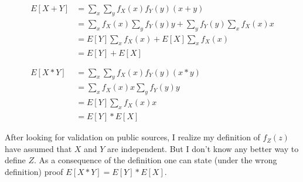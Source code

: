 \documentclass[a4paper,11pt]{article}
\begin{document}
\begin{align*}
 E[X+Y] &= \sum_x \sum_y f_X(x)f_Y(y)(x+y) \\
        &= \sum_x f_X(x) \sum_y f_Y(y)y + \sum_y f_Y(y) \sum_x f_X(x)x \\
        &= E[Y]\sum_x f_X(x) + E[X]\sum_x f_X(x) \\
        &= E[Y] + E[X]\\
\\
\\
 E[X*Y] &= \sum_x \sum_y f_X(x)f_Y(y)(x*y) \\
        &= \sum_x f_X(x)x \sum_y f_Y(y)y \\
        &= E[Y]\sum_x f_X(x)x \\
        &= E[Y] * E[X]
\end{align*}

After looking for validation on public sources, I realize my definition
of $f_Z(z)$ have assumed that $X$ and $Y$ are independent. 
But I don't know any better way to define $Z$. As a consequence of
the definition one can state (under the wrong definition)
proof $E[X*Y] = E[Y] * E[X]$.
\end{document}
